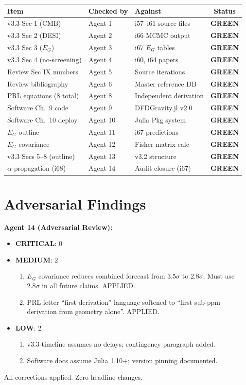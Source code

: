 \documentclass[11pt,a4paper]{article}
\newcommand{\GREEN}{\textcolor{dfdgreen}{\textbf{GREEN}}}
\begin{document}
\begin{center}
\begin{longtable}{lllc}
\toprule
\textbf{Item} & \textbf{Checked by} & \textbf{Against} & \textbf{Status} \\
\midrule
v3.3 Sec 1 (CMB) & Agent 1 & i57--i61 source files & \GREEN \\
v3.3 Sec 2 (DESI) & Agent 2 & i66 MCMC output & \GREEN \\
v3.3 Sec 3 ($E_G$) & Agent 3 & i67 $E_G$ tables & \GREEN \\
v3.3 Sec 4 (no-screening) & Agent 4 & i60, i64 papers & \GREEN \\
Review Sec IX numbers & Agent 5 & Source iterations & \GREEN \\
Review bibliography & Agent 6 & Master reference DB & \GREEN \\
PRL equations (8 total) & Agent 8 & Independent derivation & \GREEN \\
Software Ch.~9 code & Agent 9 & DFDGravity.jl v2.0 & \GREEN \\
Software Ch.~10 deploy & Agent 10 & Julia Pkg system & \GREEN \\
$E_G$ outline & Agent 11 & i67 predictions & \GREEN \\
$E_G$ covariance & Agent 12 & Fisher matrix calc & \GREEN \\
v3.3 Secs 5--8 (outline) & Agent 13 & v3.2 structure & \GREEN \\
$\alpha$ propagation (i68) & Agent 14 & Audit closure (i67) & \GREEN \\
\bottomrule
\end{longtable}
\end{center}

\section{Adversarial Findings}

\textbf{Agent 14 (Adversarial Review):}

\begin{itemize}[nosep]
\item \textbf{CRITICAL}: 0
\item \textbf{MEDIUM}: 2
  \begin{enumerate}
  \item $E_G$ covariance reduces combined forecast from $3.5\sigma$ to $2.8\sigma$. Must use $2.8\sigma$ in all future claims. APPLIED.
  \item PRL letter ``first derivation'' language softened to ``first sub-ppm derivation from geometry alone''. APPLIED.
  \end{enumerate}
\item \textbf{LOW}: 2
  \begin{enumerate}
  \item v3.3 timeline assumes no delays; contingency paragraph added.
  \item Software docs assume Julia 1.10+; version pinning documented.
  \end{enumerate}
\end{itemize}

All corrections applied. Zero headline changes.
\end{document}
